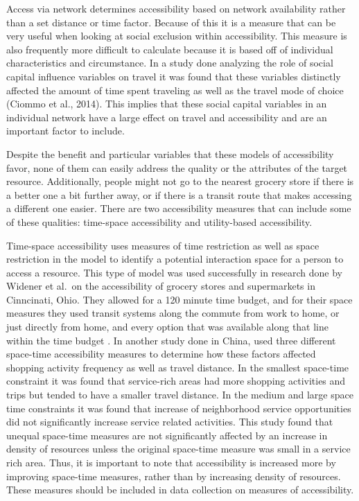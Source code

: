 \documentclass[3p, authoryear]{elsarticle} %
\begin{document}
Access via network determines accessibility based on network availability rather
than a set distance or time factor. Because of this it is a measure that can be
very useful when looking at social exclusion within accessibility. This measure
is also frequently more difficult to calculate because it is based off of
individual characteristics and circumstance. In a study done analyzing the role
of social capital influence variables on travel it was found that these
variables distinctly affected the amount of time spent traveling as well as the
travel mode of choice (Ciommo et al., 2014). This implies that these social
capital variables in an individual network have a large effect on travel and
accessibility and are an important factor to include.

Despite the benefit and particular variables that these models of accessibility
favor, none of them can easily address the quality or the attributes of the
target resource. Additionally, people might not go to the nearest grocery store
if there is a better one a bit further away, or if there is a transit route that
makes accessing a different one easier. There are two accessibility measures
that can include some of these qualities: time-space accessibility and
utility-based accessibility.

Time-space accessibility uses measures of time restriction as well as space
restriction in the model to identify a potential interaction space for a person
to access a resource. This type of model was used successfully in research done
by Widener et al.~on the accessibility of grocery stores and supermarkets in
Cinncinati, Ohio. They allowed for a 120 minute time budget, and for their space
measures they used transit systems along the commute from work to home, or just
directly from home, and every option that was available along that line within
the time budget \citep{widener2015spatiotemporal}. In another study done in China,
\citet{chen2021effects} used three different space-time accessibility measures to
determine how
these factors affected shopping activity frequency as well as travel distance.
In the smallest space-time constraint it was found that service-rich areas had
more shopping activities and trips but tended to have a smaller travel distance.
In the medium and large space time constraints it was found that increase of
neighborhood service opportunities did not significantly increase service
related activities. This study found that unequal space-time
measures are not significantly affected by an increase in density of resources
unless the original space-time measure was small in a service rich area. Thus,
it is important to note that accessibility is increased more by improving
space-time measures, rather than by increasing density of resources. These
measures should be included in data collection on measures of accessibility.
\end{document}
